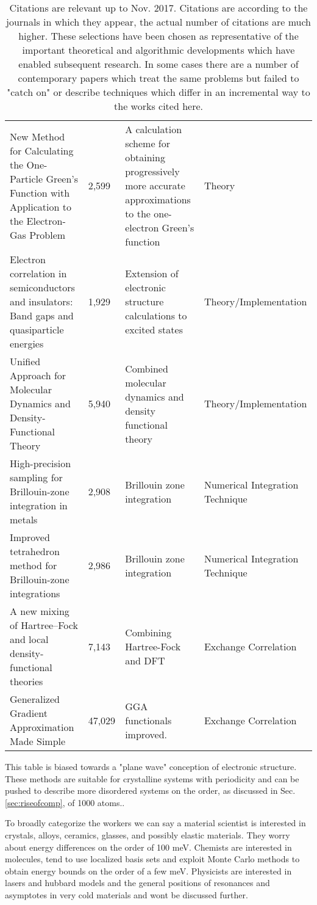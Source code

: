 \begin{table}
{\begin{tabular}{|p{6cm}|l|p{6cm}|p{4cm}|}
New Method for Calculating the One-Particle Green's Function with Application to the Electron-Gas Problem & 2,599 & A calculation scheme for
obtaining progressively more accurate approximations to the one-electron Green's function \cite{hedin65} & Theory\\
Electron correlation in semiconductors and insulators: Band gaps and quasiparticle energies \cite{hybertsen86} & 1,929 & Extension of electronic structure calculations to excited states& Theory/Implementation \\
Unified Approach for Molecular Dynamics and Density-Functional Theory \cite{car85} & 5,940 & Combined molecular dynamics and density functional theory & Theory/Implementation \\
High-precision sampling for Brillouin-zone integration in metals \cite{methfessel89} & 2,908 & Brillouin zone integration & Numerical Integration Technique \\
Improved tetrahedron method for Brillouin-zone integrations \cite{blochl94} &  2,986 & Brillouin zone integration & Numerical Integration Technique\\
A new mixing of Hartree–Fock and local density‐functional theories \cite{becke93} & 7,143 & Combining Hartree-Fock and DFT & Exchange Correlation \\
Generalized Gradient Approximation Made Simple \cite{perdew96} & 47,029 & GGA functionals improved.& Exchange Correlation \\
\end{tabular}
}
\caption{Citations are relevant up to Nov. 2017. Citations are according to the journals in which they appear, the actual number of
citations are much higher. These selections have been chosen as representative of the important theoretical and algorithmic developments
which have enabled subsequent research. In some cases there are a number of contemporary papers which
treat the same problems but failed to "catch on" or describe techniques which differ in an incremental way to the works cited here. 
\label{tab:foundation}}
\end{table}

This table is biased towards a "plane wave" conception of electronic structure. 
These methods are suitable for crystalline systems with periodicity and can be pushed 
to describe more disordered systems on the order, as discussed in Sec.\ref{sec:riseofcomp}, of 1000 atoms.. 

To broadly categorize the workers we can say a material scientist 
is interested in crystals, alloys, ceramics, glasses, and possibly elastic materials. They
worry about energy differences on the order of 100 meV. Chemists are interested in molecules, 
tend to use localized basis sets and exploit Monte Carlo methods to obtain energy 
bounds on the order of a few meV. Physicists are interested in lasers and hubbard models and the 
general positions of resonances and asymptotes in very cold materials and wont be discussed further.

